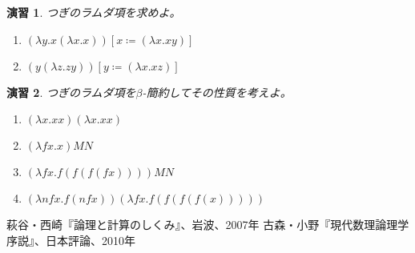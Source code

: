\documentclass[fleqn]{jsarticle}
\newtheorem{exer}{演習}
\begin{document}
\begin{exer}
つぎのラムダ項を求めよ。

\begin{enumerate}
  \item $( \lambda y.x (\lambda x.x ))[x \coloneqq ( \lambda x.xy)]$
  \item $(y ( \lambda z.zy))[y \coloneqq ( \lambda x.xz)]$
\end{enumerate}
\end{exer}

\begin{exer}
つぎのラムダ項を$\beta$-簡約してその性質を考えよ。

\begin{enumerate}
  \item $( \lambda x.xx)( \lambda x.xx)$
  \item $( \lambda fx.x)MN$
  \item $( \lambda fx.f(f(f(fx))))MN$
  \item $( \lambda nfx. f(nfx))( \lambda fx.f(f(f(f(x)))))$
\end{enumerate}

\end{exer}

\begin{thebibliography}{99}
   萩谷・西崎『論理と計算のしくみ』、岩波、2007年
   古森・小野『現代数理論理学序説』、日本評論、2010年
  \bibitem{} 
\end{thebibliography}
\end{document}
